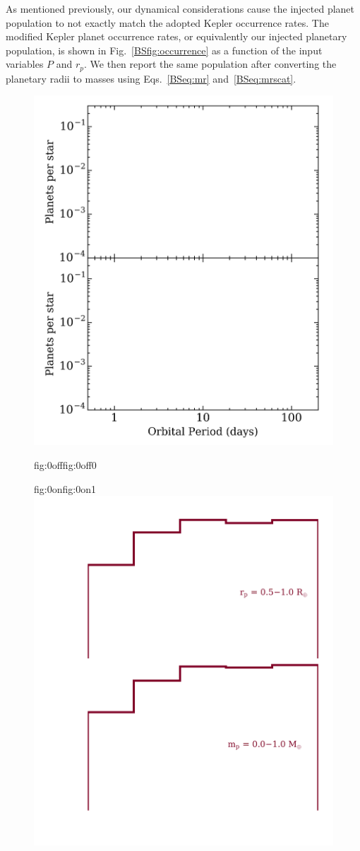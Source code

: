 As mentioned previously,
our dynamical considerations cause the injected planet population to not exactly match the adopted Kepler
occurrence rates. The modified Kepler planet occurrence
rates, or equivalently our injected planetary population, is shown in Fig.~\ref{BSfig:occurrence} as a function
of the input variables $P$ and $r_p$. We then report the same population after converting the planetary radii to
masses using Eqs.~\ref{BSeq:mr} and~\ref{BSeq:mrscat}.

\begin{figure}
  \centering
  \includegraphics[width=0.8\hsize]{figures/mpoccurrence_bkgd.png}%
  \hspace{-0.8\hsize}%
  \begin{ocg}{fig:0off}{fig:0off}{0}%
  \end{ocg}%
  \begin{ocg}{fig:0on}{fig:0on}{1}%
    \includegraphics[width=0.8\hsize]{figures/mpoccurrence_0.png}%

\end{ocg}
\end{figure}
